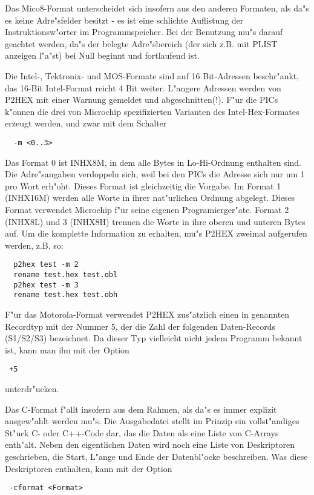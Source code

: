 \documentclass[12pt,a4paper,twoside]{report}
\begin{document}
Das Mico8-Format unterscheidet sich insofern aus den anderen
Formaten, als da"s es keine Adre"sfelder besitzt - es ist eine
schlichte Auflistung der Instruktionsw"orter im Programmspeicher.
Bei der Benutzung mu"s darauf geachtet werden, da"s der
belegte Adre"sbereich (der sich z.B. mit PLIST anzeigen l"a"st)
bei Null beginnt und fortlaufend ist.

Die Intel-, Tektronix- und MOS-Formate sind auf 16 Bit-Adressen
beschr"ankt, das 16-Bit Intel-Format reicht 4 Bit weiter.  L"angere
Adressen werden von P2HEX mit einer Warnung gemeldet und abgeschnitten(!).
F"ur die PICs k"onnen die drei von Microchip spezifizierten Varianten des
Intel-Hex-Formates erzeugt werden, und zwar mit dem Schalter
\begin{verbatim}
  -m <0..3>
\end{verbatim}
Das Format 0 ist INHX8M, in dem alle Bytes in Lo-Hi-Ordnung enthalten
sind.  Die Adre"sangaben verdoppeln sich, weil bei den PICs die Adresse
sich nur um 1 pro Wort erh"oht.  Dieses Format ist gleichzeitig die Vorgabe.
Im Format 1 (INHX16M) werden alle Worte in ihrer nat"urlichen Ordnung
abgelegt.  Dieses Format verwendet Microchip f"ur seine eigenen
Programierger"ate.  Format 2 (INHX8L) und 3 (INHX8H) trennen die Worte
in ihre oberen und unteren Bytes auf.  Um die komplette Information zu
erhalten, mu"s P2HEX zweimal aufgerufen werden, z.B. so:
\begin{verbatim}
  p2hex test -m 2
  rename test.hex test.obl
  p2hex test -m 3
  rename test.hex test.obh
\end{verbatim}
F"ur das Motorola-Format verwendet P2HEX zus"atzlich einen in \cite{CPM68K}
genannten Recordtyp mit der Nummer 5, der die Zahl der folgenden
Daten-Records (S1/S2/S3) bezeichnet.  Da dieser Typ vielleicht nicht jedem
Programm bekannt ist, kann man ihn mit der Option
\begin{verbatim}
 +5
\end{verbatim}
unterdr"ucken.
\par
Das C-Format f"allt insofern aus dem Rahmen, als da"s es immer explizit 
ausgew"ahlt werden mu"s.  Die Ausgabedatei stellt im Prinzip ein vollst"andiges
St"uck C- oder C++-Code dar, das die Daten als eine Liste von C-Arrays
enth"alt.  Neben den eigentlichen Daten wird noch eine Liste von Deskriptoren
geschrieben, die Start, L"ange und Ende der Datenbl"ocke 
beschreiben.  Was diese Deskriptoren enthalten, kann mit der Option
\begin{verbatim}
 -cformat <Format>
\end{verbatim}
\end{document}
